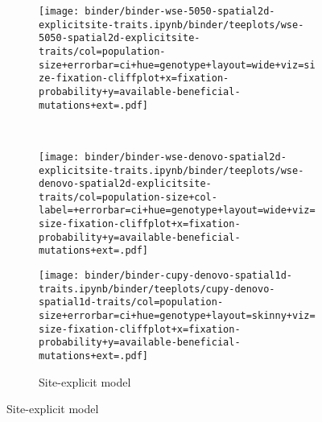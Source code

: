\begin{figure}[h]
\begin{minipage}{\textwidth}
    \vspace{-10ex}

    \begin{subfigure}[b]{\linewidth}
        \begin{minipage}{0.41\textwidth}
          \texttt{[image: binder/binder-wse-5050-spatial2d-explicitsite-traits.ipynb/binder/teeplots/wse-5050-spatial2d-explicitsite-traits/col=population-size+errorbar=ci+hue=genotype+layout=wide+viz=size-fixation-cliffplot+x=fixation-probability+y=available-beneficial-mutations+ext=.pdf]}%
        \end{minipage}%
        \begin{minipage}{0.06\textwidth}
          ~
        \end{minipage}%
        \begin{minipage}{0.38\textwidth}
          \texttt{[image: binder/binder-wse-denovo-spatial2d-explicitsite-traits.ipynb/binder/teeplots/wse-denovo-spatial2d-explicitsite-traits/col=population-size+col-label=+errorbar=ci+hue=genotype+layout=wide+viz=size-fixation-cliffplot+x=fixation-probability+y=available-beneficial-mutations+ext=.pdf]}%
        \end{minipage}%
      \begin{minipage}{0.12\textwidth}
        \raggedright
        \large
        \vspace{10ex}
        \caption{Site-explicit model}
        \label{fig:denovo-5050-conditions:site-explicit}

        \texttt{[image: binder/binder-cupy-denovo-spatial1d-traits.ipynb/binder/teeplots/cupy-denovo-spatial1d-traits/col=population-size+errorbar=ci+hue=genotype+layout=skinny+viz=size-fixation-cliffplot+x=fixation-probability+y=available-beneficial-mutations+ext=.pdf]}%
      \end{minipage}%
    \end{subfigure}%

  \end{minipage}

  \vspace{-10ex}


\end{figure}
